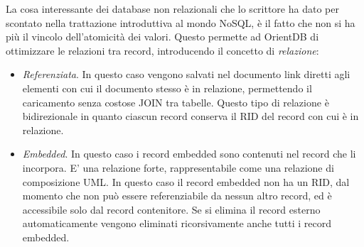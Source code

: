 La cosa interessante dei database non relazionali che lo scrittore ha dato per scontato nella trattazione introduttiva al mondo NoSQL, è il fatto che non si ha più il vincolo dell'atomicità dei valori. Questo permette ad OrientDB di ottimizzare le relazioni tra record, introducendo il concetto di \emph{relazione}:
\begin{itemize}
\item \emph{Referenziata}. In questo caso vengono salvati nel documento link diretti agli elementi con cui il documento stesso è in relazione, permettendo il caricamento senza costose JOIN tra tabelle. Questo tipo di relazione è bidirezionale in quanto ciascun record conserva il RID del record con cui è in relazione.
\item \emph{Embedded}. In questo caso i record embedded sono contenuti nel record che li incorpora. E' una relazione forte, rappresentabile come una relazione di composizione UML. In questo caso il record embedded non ha un RID, dal momento che non può essere referenziabile da nessun altro record, ed è accessibile solo dal record contenitore. Se si elimina il record esterno automaticamente vengono eliminati ricorsivamente anche tutti i record embedded.
\end{itemize}

\endinput

